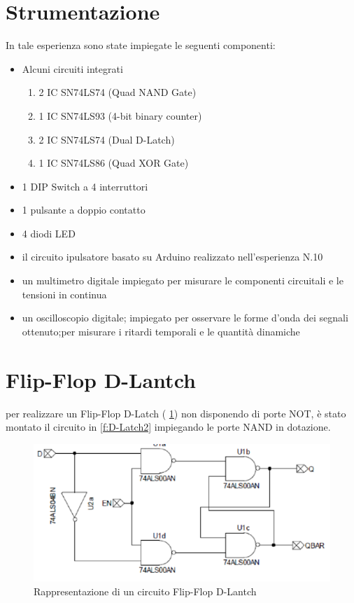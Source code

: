 \section{Strumentazione}
	In tale esperienza sono state impiegate le seguenti componenti:\begin{itemize}
		\item Alcuni circuiti integrati \begin{enumerate}
			\item 2 IC SN74LS74 (Quad NAND Gate)
			\item 1 IC SN74LS93 (4-bit binary counter)
			\item 2 IC SN74LS74 (Dual D-Latch)
			\item 1 IC SN74LS86 (Quad XOR Gate)
		\end{enumerate}
		\item 1 DIP Switch a 4 interruttori
		\item 1 pulsante a doppio contatto
		\item 4 diodi LED
		\item il circuito ipulsatore basato su Arduino realizzato nell'esperienza N.10
		\item un multimetro digitale impiegato per misurare le componenti circuitali e le tensioni in continua
		\item un oscilloscopio digitale; impiegato per osservare le forme d'onda dei segnali ottenuto;per misurare i ritardi temporali e le quantità dinamiche
	\end{itemize}
\section{Flip-Flop D-Lantch}
	per realizzare un Flip-Flop D-Latch (\figurename{ \ref{f:D-Latch1}}) non disponendo di porte NOT, è stato montato il circuito in \figurename{ \ref{f:D-Latch2}} impiegando le
	porte NAND in dotazione.
	\begin{figure}[hb]
		\centering
		\includegraphics[scale=0.75]{../Figs-Tabs/D-Latch1.png}
		\caption{Rappresentazione di un circuito Flip-Flop D-Lantch}
			\label{f:D-Latch1}
	\end{figure}

